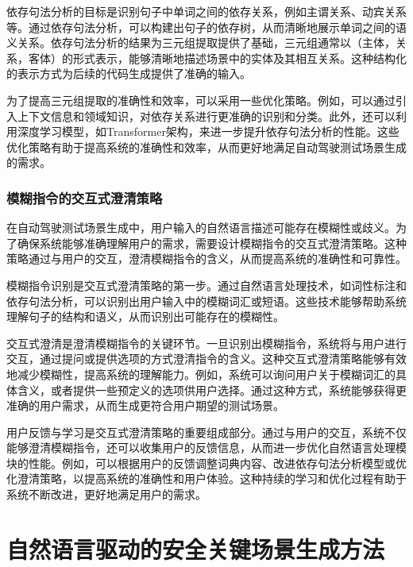\documentclass{article}
\begin{document}
依存句法分析的目标是识别句子中单词之间的依存关系，例如主谓关系、动宾关系等。通过依存句法分析，可以构建出句子的依存树，从而清晰地展示单词之间的语义关系。依存句法分析的结果为三元组提取提供了基础，三元组通常以（主体，关系，客体）的形式表示，能够清晰地描述场景中的实体及其相互关系。这种结构化的表示方式为后续的代码生成提供了准确的输入。

为了提高三元组提取的准确性和效率，可以采用一些优化策略。例如，可以通过引入上下文信息和领域知识，对依存关系进行更准确的识别和分类。此外，还可以利用深度学习模型，如Transformer架构，来进一步提升依存句法分析的性能。这些优化策略有助于提高系统的准确性和效率，从而更好地满足自动驾驶测试场景生成的需求。

\subsubsection{模糊指令的交互式澄清策略}
在自动驾驶测试场景生成中，用户输入的自然语言描述可能存在模糊性或歧义。为了确保系统能够准确理解用户的需求，需要设计模糊指令的交互式澄清策略。这种策略通过与用户的交互，澄清模糊指令的含义，从而提高系统的准确性和可靠性。

模糊指令识别是交互式澄清策略的第一步。通过自然语言处理技术，如词性标注和依存句法分析，可以识别出用户输入中的模糊词汇或短语。这些技术能够帮助系统理解句子的结构和语义，从而识别出可能存在的模糊性。

交互式澄清是澄清模糊指令的关键环节。一旦识别出模糊指令，系统将与用户进行交互，通过提问或提供选项的方式澄清指令的含义。这种交互式澄清策略能够有效地减少模糊性，提高系统的理解能力。例如，系统可以询问用户关于模糊词汇的具体含义，或者提供一些预定义的选项供用户选择。通过这种方式，系统能够获得更准确的用户需求，从而生成更符合用户期望的测试场景。

用户反馈与学习是交互式澄清策略的重要组成部分。通过与用户的交互，系统不仅能够澄清模糊指令，还可以收集用户的反馈信息，从而进一步优化自然语言处理模块的性能。例如，可以根据用户的反馈调整词典内容、改进依存句法分析模型或优化澄清策略，以提高系统的准确性和用户体验。这种持续的学习和优化过程有助于系统不断改进，更好地满足用户的需求。

\section{自然语言驱动的安全关键场景生成方法}
\end{document}
